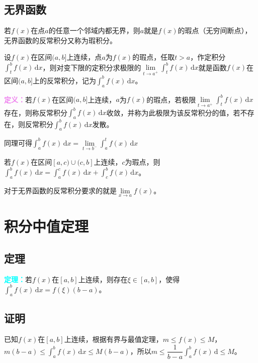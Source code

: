 \documentclass[UTF8, 12pt]{ctexart}
\begin{document}
\subsection{无界函数}

若$f(x)$在点$a$的任意一个邻域内都无界，则$a$就是$f(x)$的瑕点（无穷间断点），无界函数的反常积分又称为瑕积分。

设$f(x)$在区间$(a,b]$上连续，点$a$为$f(x)$的瑕点，任取$t>a$，作定积分$\int_t^bf(x)\,\textrm{d}x$，则对变下限的定积分求极限的$\lim\limits_{t\to a^+}\int_t^bf(x)\,\textrm{d}x$就是函数$f(x)$在区间$(a,b]$上的反常积分，记为$\int_a^bf(x)\,\textrm{d}x$。

\textcolor{violet}{\textbf{定义：}}若$f(x)$在区间$(a,b]$上连续，$a$为$f(x)$的瑕点，若极限$\lim\limits_{t\to a^+}\int_t^bf(x)\,\textrm{d}x$存在，则称反常积分$\int_a^bf(x)\,\textrm{d}x$收敛，并称为此极限为该反常积分的值，若不存在，则反常积分$\int_a^bf(x)\,\textrm{d}x$发散。

同理可得$\int_a^bf(x)\,\textrm{d}x=\lim\limits_{t\to b^-}\int_a^tf(x)\,\textrm{d}x$

若$f(x)$在区间$[a,c)\cup(c,b]$上连续，$c$为瑕点，则$\int_a^bf(x)\,\textrm{d}x=\int_a^cf(x)\,\textrm{d}x+\int_c^bf(x)\,\textrm{d}x$。

对于无界函数的反常积分要求的就是$\lim\limits_{x\to a}f(x)$。


\section{积分中值定理}

\subsection{定理}

\textcolor{aqua}{\textbf{定理：}}若$f(x)$在$[a,b]$上连续，则存在$\xi\in[a,b]$，使得$\int_a^bf(x)\,\textrm{d}x=f(\xi)(b-a)$。

\subsection{证明}

已知$f(x)$在$[a,b]$上连续，根据有界与最值定理，$m\leqslant f(x)\leqslant M$，$m(b-a)\leqslant\int_a^bf(x)\,\textrm{d}x\leqslant M(b-a)$，所以$m\leqslant\dfrac{1}{b-a}\int_a^bf(x)\,\textrm{d}\leqslant M$。
\end{document}
